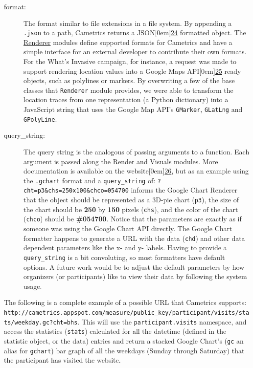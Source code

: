 \documentclass[10pt,a4paper,english]{article}
\begin{document}
\begin{description}
\item[{format:}] \leavevmode 
The format similar to file extensions in a file system. By appending a \texttt{.json} to a path, Cametrics returns a JSON\raisebox{.5em}[0em]{\scriptsize\hyperlink{id52}{24}} formatted object. The \href{\#renderer}{Renderer} modules define supported formats for Cametrics and have a simple interface for an external developer to contribute their own formats. For the What's Invasive campaign, for instance, a request was made to support rendering location values into a Google Maps API\raisebox{.5em}[0em]{\scriptsize\hyperlink{id53}{25}} ready objects, such as polylines or markers. By overwriting a few of the base classes that \texttt{Renderer} module provides, we were able to transform the location traces from one representation (a Python dictionary) into a JavaScript string that uses the Google Map API's \texttt{GMarker}, \texttt{GLatLng} and \texttt{GPolyLine}.

\item[{query{\_}string:}] \leavevmode 
The query string is the analogous of passing arguments to a function. Each argument is passed along the Render and Visuals modules. More documentation is available on the website\raisebox{.5em}[0em]{\scriptsize\hyperlink{id55}{26}}, but as an example using the \texttt{.gchart} format and a \texttt{query{\_}string} of: \texttt{?cht=p3{\&}chs=250x100{\&}chco=054700} informs the Google Chart Renderer that the object should be represented as a 3D-pie chart (\texttt{p3}), the size of the chart should be \textbf{250} by \textbf{150} pixels (\texttt{chs}), and the color of the chart (\texttt{chco}) should be \textbf{{\#}054700}. Notice that the parameters are exactly as if someone was using the Google Chart API directly. The Google Chart formatter happens to generate a URL with the data (\texttt{chd}) and other data dependent parameters like the x- and y- labels. Having to provide a \texttt{query{\_}string} is a bit convoluting, so most formatters have default options. A future work would be to adjust the default parameters by how organizers (or participants) like to view their data by following the system usage.

\end{description}

The following is a complete example of a possible URL that Cametrics supports: \texttt{http://cametrics.appspot.com/measure/public{\_}key/participant/visits/stats/weekday.gc?cht=bhs}. This will use the \texttt{participant.visits} namespace, and access the statistics (\texttt{stats}) calculated for all the datetime (defined in the statistic object, or the data) entries and return a stacked Google Chart's (\texttt{gc} an alias for \texttt{gchart}) bar graph of all the weekdays (Sunday through Saturday) that the participant has visited the website.
\end{document}
